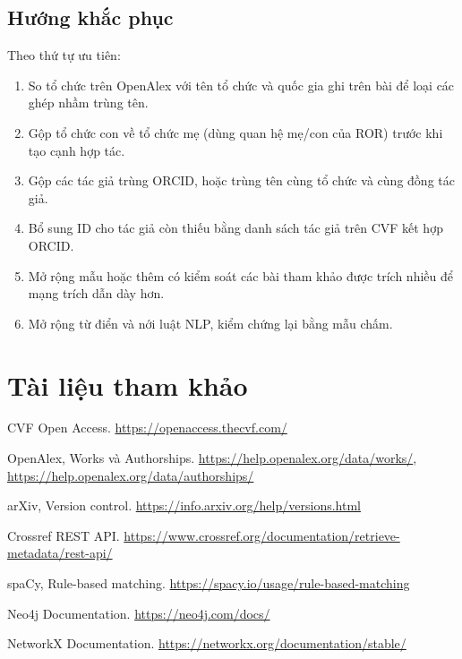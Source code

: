 \documentclass[11pt,a4paper]{article}
\begin{document}
\subsection{Hướng khắc phục}
Theo thứ tự ưu tiên:
\begin{enumerate}[leftmargin=1.6em]
  \item So tổ chức trên OpenAlex với tên tổ chức và quốc gia ghi trên bài để loại các ghép nhầm trùng tên.
  \item Gộp tổ chức con về tổ chức mẹ (dùng quan hệ mẹ/con của ROR) trước khi tạo cạnh hợp tác.
  \item Gộp các tác giả trùng ORCID, hoặc trùng tên cùng tổ chức và cùng đồng tác giả.
  \item Bổ sung ID cho tác giả còn thiếu bằng danh sách tác giả trên CVF kết hợp ORCID.
  \item Mở rộng mẫu hoặc thêm có kiểm soát các bài tham khảo được trích nhiều để mạng trích dẫn dày hơn.
  \item Mở rộng từ điển và nới luật NLP, kiểm chứng lại bằng mẫu chấm.
\end{enumerate}
\newpage

\section*{Tài liệu tham khảo}
\begin{enumerate}[leftmargin=2em, label={[\arabic*]}]
  \item CVF Open Access. \url{https://openaccess.thecvf.com/}
  \item OpenAlex, Works và Authorships. \url{https://help.openalex.org/data/works/}, \url{https://help.openalex.org/data/authorships/}
  \item arXiv, Version control. \url{https://info.arxiv.org/help/versions.html}
  \item Crossref REST API. \url{https://www.crossref.org/documentation/retrieve-metadata/rest-api/}
  \item spaCy, Rule-based matching. \url{https://spacy.io/usage/rule-based-matching}
  \item Neo4j Documentation. \url{https://neo4j.com/docs/}
  \item NetworkX Documentation. \url{https://networkx.org/documentation/stable/}
\end{enumerate}
\end{document}
